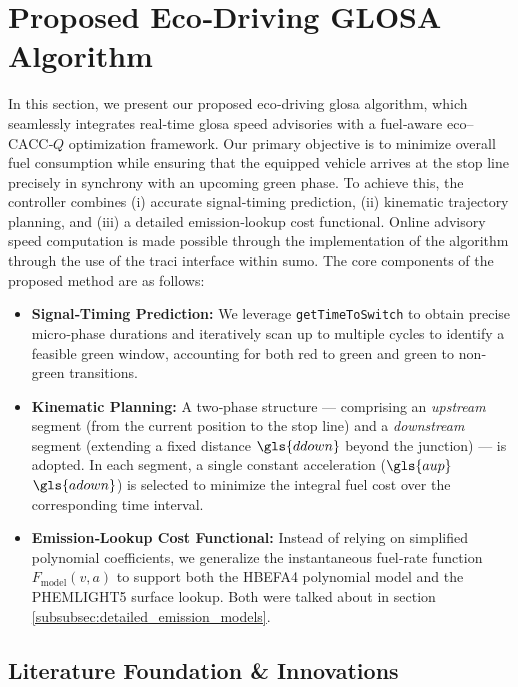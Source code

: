 \section{Proposed Eco‐Driving GLOSA Algorithm}
\label{sec:Proposed_Eco_Driving_GLOSA_Algorithm}

In this section, we present our proposed eco‐driving \ac{glosa} algorithm, which seamlessly integrates real‐time \ac{glosa} speed advisories with a fuel‐aware \ac{eco}–\ac{CACC}‐$Q$ optimization framework. Our primary objective is to minimize overall fuel consumption while ensuring that the equipped vehicle arrives at the stop line precisely in synchrony with an upcoming green phase. To achieve this, the controller combines (i) accurate signal‐timing prediction, (ii) kinematic trajectory planning, and (iii) a detailed emission‐lookup cost functional. Online advisory speed computation is made possible through the implementation of the algorithm through the use of the \ac{traci} interface within \ac{sumo}.
\mynewline
The core components of the proposed method are as follows:
\begin{itemize}
  \item \textbf{Signal‐Timing Prediction:} We leverage \texttt{getTimeToSwitch} to obtain precise micro‐phase durations and iteratively scan up to multiple cycles to identify a feasible green window, accounting for both red to green and green to non‐green transitions.
  \item \textbf{Kinematic Planning:} A two‐phase structure --- comprising an \emph{upstream} segment (from the current position to the stop line) and a \emph{downstream} segment (extending a fixed distance $\gls{ddown}$ beyond the junction) --- is adopted. In each segment, a single constant acceleration ($\gls{aup}$  $\gls{adown}$) is selected to minimize the integral fuel cost over the corresponding time interval.
  \item \textbf{Emission‐Lookup Cost Functional:} Instead of relying on simplified polynomial coefficients, we generalize the instantaneous fuel‐rate function $F_{\text{model}}(v,a)$ to support both the HBEFA4 polynomial model and the PHEMLIGHT5 surface lookup. Both were talked about in section \ref{subsubsec:detailed_emission_models}.
\end{itemize}

\subsection{Literature Foundation \& Innovations}
\label{sec:EcoGlosa_Background}

